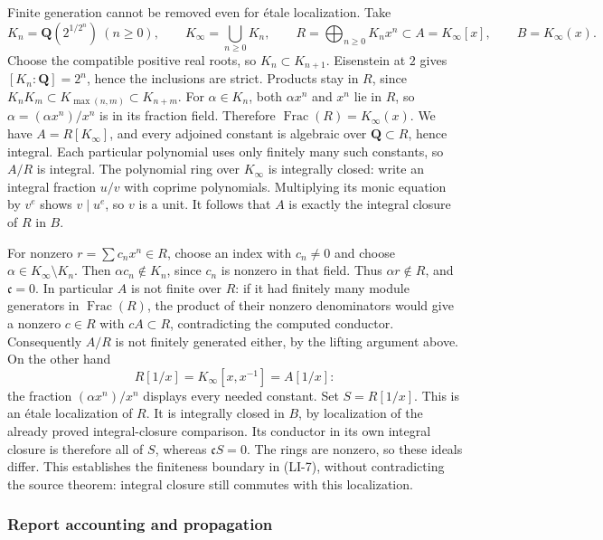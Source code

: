 Finite generation cannot be removed even for étale localization. Take \[
K_n=\mathbf Q(2^{1/2^n})\ (n\geq0),\qquad
K_\infty=\bigcup_{n\geq0}K_n,\qquad
R=\bigoplus_{n\geq0}K_nx^n\subset A=K_\infty[x],\qquad
B=K_\infty(x).
\] Choose the compatible positive real roots, so \(K_n\subset K_{n+1}\). Eisenstein at \(2\) gives \([K_n:\mathbf Q]=2^n\), hence the inclusions are strict. Products stay in \(R\), since \(K_nK_m\subset K_{\max(n,m)}\subset K_{n+m}\). For \(\alpha\in K_n\), both \(\alpha x^n\) and \(x^n\) lie in \(R\), so \(\alpha=(\alpha x^n)/x^n\) is in its fraction field. Therefore \(\operatorname{Frac}(R)=K_\infty(x)\). We have \(A=R[K_\infty]\), and every adjoined constant is algebraic over \(\mathbf Q\subset R\), hence integral. Each particular polynomial uses only finitely many such constants, so \(A/R\) is integral. The polynomial ring over \(K_\infty\) is integrally closed: write an integral fraction \(u/v\) with coprime polynomials. Multiplying its monic equation by \(v^e\) shows \(v\mid u^e\), so \(v\) is a unit. It follows that \(A\) is exactly the integral closure of \(R\) in \(B\).

For nonzero \(r=\sum c_nx^n\in R\), choose an index with \(c_n\ne0\) and choose \(\alpha\in K_\infty\setminus K_n\). Then \(\alpha c_n\notin K_n\), since \(c_n\) is nonzero in that field. Thus \(\alpha r\notin R\), and \(\mathfrak c=0\). In particular \(A\) is not finite over \(R\): if it had finitely many module generators in \(\operatorname{Frac}(R)\), the product of their nonzero denominators would give a nonzero \(c\in R\) with \(cA\subset R\), contradicting the computed conductor. Consequently \(A/R\) is not finitely generated either, by the lifting argument above. On the other hand \[
R[1/x]=K_\infty[x,x^{-1}]=A[1/x]:
\] the fraction \((\alpha x^n)/x^n\) displays every needed constant. Set \(S=R[1/x]\). This is an étale localization of \(R\). It is integrally closed in \(B\), by localization of the already proved integral-closure comparison. Its conductor in its own integral closure is therefore all of \(S\), whereas \(\mathfrak cS=0\). The rings are nonzero, so these ideals differ. This establishes the finiteness boundary in (LI-7), without contradicting the source theorem: integral closure still commutes with this localization.

\subsubsection{Report accounting and propagation}\label{report-accounting-and-propagation}


